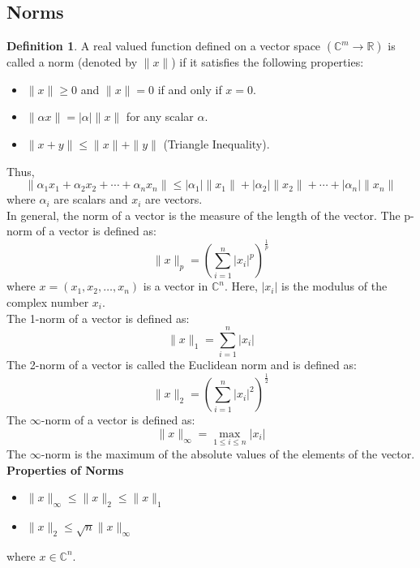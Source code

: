 \documentclass[12pt, oneside]{book}
\theoremstyle{definition}
\newtheorem{definition}{Definition}[section]
\theoremstyle{definition}
\theoremstyle{remark}
\begin{document}
\subsection{Norms}
\begin{definition}
    A real valued function defined on a vector space $(\mathbb{C}^m \rightarrow \mathbb{R})$ is called a norm (denoted by $\|x\|$) 
    if it satisfies the following properties:
    \begin{itemize}
        \item $\|x\| \geq 0$ and $\|x\|=0$ if and only if $x=0$.
        \item $\|\alpha x\|=|\alpha|\|x\|$ for any scalar $\alpha$.
        \item $\|x+y\| \leq \|x\|+\|y\|$ (Triangle Inequality).
    \end{itemize}
\end{definition}
Thus, 
\[\|\alpha_1x_1+\alpha_2x_2 + \cdots +\alpha_n x_n\| \leq |\alpha_1|\|x_1\|+|\alpha_2|\|x_2\| + \cdots + |\alpha_n|\|x_n\| \]
where $\alpha_i$ are scalars and $x_i$ are vectors.\\
In general, the norm of a vector is the measure of the length of the vector.
The p-norm of a vector is defined as:
\[ \|x\|_p=(\sum_{i=1}^n |x_i|^p)^{\frac{1}{p}} \]
where $x=(x_1,x_2,\ldots,x_n)$ is a vector in $\mathbb{C}^n$. Here, $|x_i|$ is the modulus of the complex number $x_i$.\\
The 1-norm of a vector is defined as:
\[ \|x\|_1=\sum_{i=1}^n |x_i| \]
The 2-norm of a vector is called the Euclidean norm and is defined as:
\[ \|x\|_2=(\sum_{i=1}^n |x_i|^2)^{\frac{1}{2}} \]
The $\infty$-norm of a vector is defined as:
\[ \|x\|_{\infty}=\max_{1\leq i \leq n} |x_i| \]
The $\infty$-norm is the maximum of the absolute values of the elements of the vector.\\

\textbf{Properties of Norms}
\begin{itemize}
    \item $\|x\|_{\infty} \leq \|x\|_2 \leq \|x\|_1$
    \item $\|x\|_2 \leq \sqrt{n}\|x\|_{\infty}$
\end{itemize}
where $x \in \mathbb{C}^n$.\\
\end{document}
